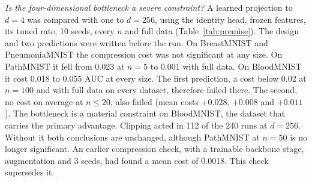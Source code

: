 \documentclass{ieeeaccess}
\begin{document}
\emph{Is the four-dimensional bottleneck a severe constraint?} A learned projection to $d=4$ was compared with one to $d=256$, using the identity head, frozen features, its tuned rate, 10 seeds, every $n$ and full data (Table~\ref{tab:premise}). The design and two predictions were written before the run. On BreastMNIST and PneumoniaMNIST the compression cost was not significant at any size. On PathMNIST it fell from 0.023 at $n=5$ to 0.001 with full data. On BloodMNIST it cost 0.018 to 0.055 AUC at every size. The first prediction, a cost below 0.02 at $n=100$ and with full data on every dataset, therefore failed there. The second, no cost on average at $n\le20$, also failed (mean costs $+0.028$, $+0.008$ and $+0.011$). The bottleneck is a material constraint on BloodMNIST, the dataset that carries the primary advantage. Clipping acted in 112 of the 240 runs at $d=256$. Without it both conclusions are unchanged, although PathMNIST at $n=50$ is no longer significant. An earlier compression check, with a trainable backbone stage, augmentation and 3 seeds, had found a mean cost of 0.0018. This check supersedes it.

\begin{table}[t]
\caption{Cost of compression with frozen features: AUC($d=256$) $-$ AUC($d=4$), identity head, 10 seeds, nested bootstrap, corrected within the analysis ($m=24$). Bold: interval excludes zero and $p_{\mathrm{adj}}\le0.05$. Exploratory.}
\label{tab:premise}
\centering
\setlength{\tabcolsep}{2pt}
\footnotesize
{}
\end{table}
\end{document}
